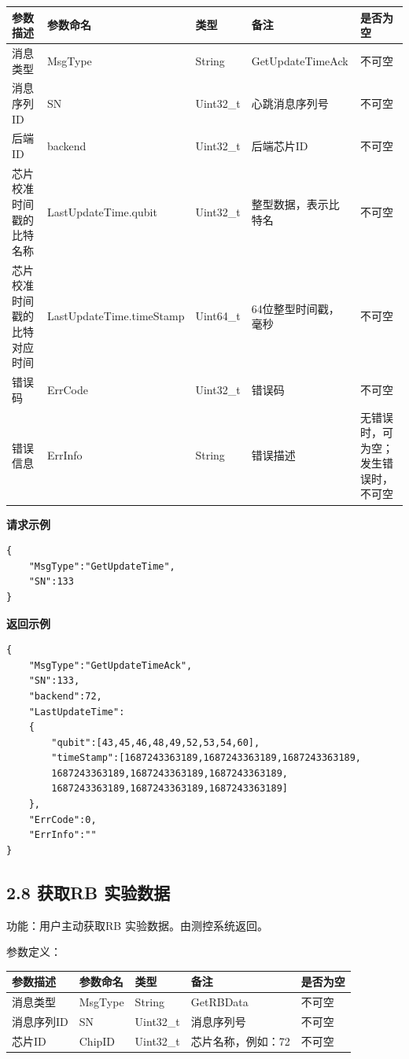 \documentclass{ctexart}
\begin{document}
\begin{longtable}{|l|l|l|l|l|}
\hline
\textbf{\textbf{参数描述}} & \textbf{\textbf{参数命名}} & \textbf{\textbf{类型}} & \textbf{\textbf{备注}} & \textbf{\textbf{是否为空}} \\
\hline
消息类型 & MsgType & String & GetUpdateTimeAck & 不可空 \\
消息序列ID & SN & Uint32_t & 心跳消息序列号 & 不可空 \\
后端ID & backend & Uint32_t & 后端芯片ID & 不可空 \\
芯片校准时间戳的比特名称 & LastUpdateTime.qubit & Uint32_t & 整型数据，表示比特名 & 不可空 \\
芯片校准时间戳的比特对应时间 & LastUpdateTime.timeStamp & Uint64_t & 64位整型时间戳，毫秒 & 不可空 \\
错误码 & ErrCode & Uint32_t & 错误码 & 不可空 \\
错误信息 & ErrInfo & String & 错误描述 & 无错误时，可为空；发生错误时，不可空 \\
\hline
\end{longtable}

\textbf{请求示例}

\begin{verbatim}{
    "MsgType":"GetUpdateTime",
    "SN":133
}\end{verbatim}

\textbf{返回示例}

\begin{verbatim}{
    "MsgType":"GetUpdateTimeAck",
    "SN":133,
    "backend":72,
    "LastUpdateTime":
    {
        "qubit":[43,45,46,48,49,52,53,54,60],
        "timeStamp":[1687243363189,1687243363189,1687243363189,
        1687243363189,1687243363189,1687243363189,
        1687243363189,1687243363189,1687243363189]
    },
    "ErrCode":0,
    "ErrInfo":""
}\end{verbatim}

\subsection{2.8 获取RB 实验数据}

功能：用户主动获取RB 实验数据。由测控系统返回。

参数定义：

\begin{longtable}{|l|l|l|l|l|}
\hline
\textbf{\textbf{参数描述}} & \textbf{\textbf{参数命名}} & \textbf{\textbf{类型}} & \textbf{\textbf{备注}} & \textbf{\textbf{是否为空}} \\
\hline
消息类型 & MsgType & String & GetRBData & 不可空 \\
消息序列ID & SN & Uint32_t & 消息序列号 & 不可空 \\
芯片ID & ChipID & Uint32_t & 芯片名称，例如：72 & 不可空 \\
\hline
\end{longtable}
\end{document}
